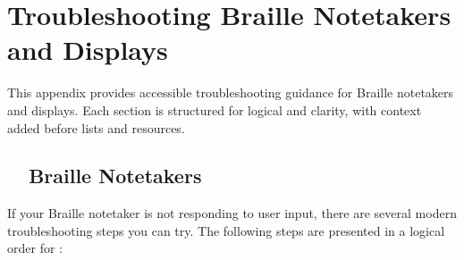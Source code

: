 \chapter{Troubleshooting Braille Notetakers and Displays}
\label{app2:trouble2}

\begin{raggedright}
	This appendix provides accessible troubleshooting guidance for Braille notetakers and displays. Each section is structured for logical  and  clarity, with context added before lists and resources.
\end{raggedright}

\section{~~Braille Notetakers}
\label{app2:notebook}
If your Braille notetaker is not responding to user input, there are several modern troubleshooting steps you can try. The following steps are presented in a logical order for :

